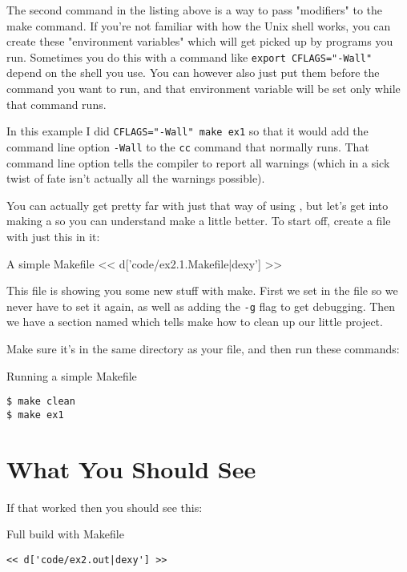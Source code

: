 The second command in the listing above is a way to pass "modifiers" to the
make command.  If you're not familiar with how the Unix shell works, you can
create these "environment variables" which will get picked up by programs
you run.  Sometimes you do this with a command like \verb|export CFLAGS="-Wall"| depend on the shell you use.  You can however also just put them before
the command you want to run, and that environment variable will be set
only while that command runs.

In this example I did \verb|CFLAGS="-Wall" make ex1| so that it would
add the command line option \verb|-Wall| to the \verb|cc| command that
 normally runs.  That command line option tells the compiler
 to report all warnings (which in a sick twist of fate isn't
actually all the warnings possible).

You can actually get pretty far with just that way of using ,
but let's get into making a  so you can understand
make a little better.  To start off, create a file with just this
in it:

\begin{code}{A simple Makefile}
<< d['code/ex2.1.Makefile|dexy'] >>
\end{code}

This file is showing you some new stuff with make.  First we set
 in the file so we never have to set it again, as well
as adding the \verb|-g| flag to get debugging.  Then we have a 
section named  which tells make how to clean up our
little project.

Make sure it's in the same directory as your  file, and then
run these commands:

\begin{Terminal}{Running a simple Makefile}
\begin{lstlisting}
$ make clean
$ make ex1
\end{lstlisting}
\end{Terminal}

\section{What You Should See}

If that worked then you should see this:

\begin{Terminal}{Full build with Makefile}
\begin{lstlisting}
<< d['code/ex2.out|dexy'] >>
\end{lstlisting}
\end{Terminal}

